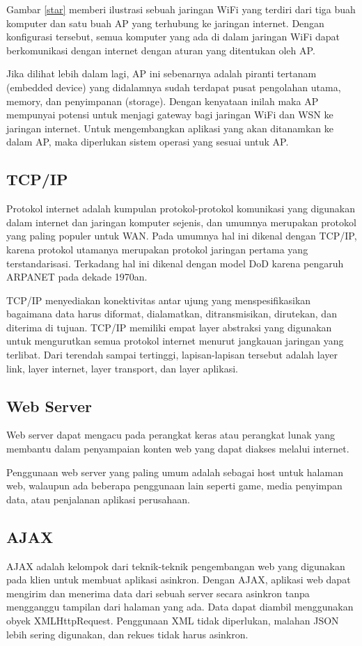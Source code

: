 \documentclass{jtetiproposalskripsi}
\begin{document}
Gambar \ref{star} memberi ilustrasi sebuah jaringan WiFi yang terdiri dari tiga buah komputer dan satu buah AP yang terhubung ke jaringan internet. Dengan konfigurasi tersebut, semua komputer yang ada di dalam jaringan WiFi dapat berkomunikasi dengan internet dengan aturan yang ditentukan oleh AP.

Jika dilihat lebih dalam lagi, AP ini sebenarnya adalah piranti tertanam (embedded device) yang didalamnya sudah terdapat pusat pengolahan utama, memory, dan penyimpanan (storage). Dengan kenyataan inilah maka AP mempunyai potensi untuk menjagi gateway bagi jaringan WiFi dan WSN ke jaringan internet. Untuk mengembangkan aplikasi yang akan ditanamkan ke dalam AP, maka diperlukan sistem operasi yang sesuai untuk AP.

\subsection{TCP/IP}
Protokol internet adalah kumpulan protokol-protokol komunikasi yang digunakan dalam internet dan jaringan komputer sejenis, dan umumnya merupakan protokol yang paling populer untuk WAN. Pada umumnya hal ini dikenal dengan TCP/IP, karena protokol utamanya merupakan protokol jaringan pertama yang terstandarisasi. Terkadang hal ini dikenal dengan model DoD karena pengaruh ARPANET pada dekade 1970an.

TCP/IP menyediakan konektivitas antar ujung yang menspesifikasikan bagaimana data harus diformat, dialamatkan, ditransmisikan, dirutekan, dan diterima di tujuan. TCP/IP memiliki empat layer abstraksi yang digunakan untuk mengurutkan semua protokol internet menurut jangkauan jaringan yang terlibat. Dari terendah sampai tertinggi, lapisan-lapisan tersebut adalah layer link, layer internet, layer transport, dan layer aplikasi.


\subsection{Web Server}
Web server dapat mengacu pada perangkat keras atau perangkat lunak yang membantu dalam penyampaian konten web yang dapat diakses melalui internet.

Penggunaan web server yang paling umum adalah sebagai host untuk halaman web, walaupun ada beberapa penggunaan lain seperti game, media penyimpan data, atau penjalanan aplikasi perusahaan.


\subsection{AJAX}
AJAX adalah kelompok dari teknik-teknik pengembangan web yang digunakan pada klien untuk membuat aplikasi asinkron. Dengan AJAX, aplikasi web dapat mengirim dan menerima data dari sebuah server secara asinkron tanpa mengganggu tampilan dari halaman yang ada. Data dapat diambil menggunakan obyek XMLHttpRequest. Penggunaan XML tidak diperlukan, malahan JSON lebih sering digunakan, dan rekues tidak harus asinkron.
\end{document}

